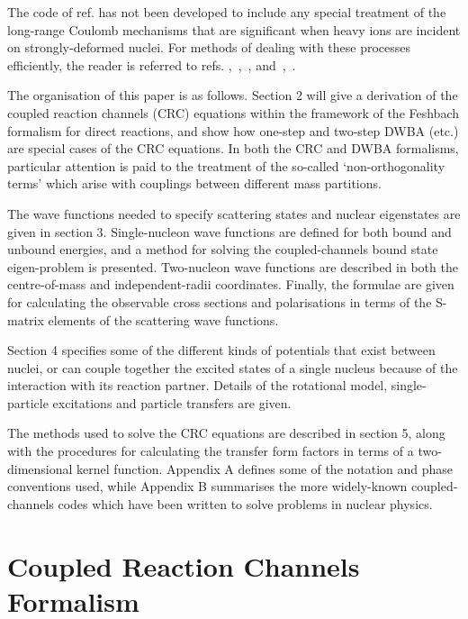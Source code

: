 \documentclass[11pt,a4paper]{article}
\begin{document}
The code of ref.\cite{FRESCO} has not been developed to include any
special treatment of the long-range Coulomb mechanisms that are significant
when heavy ions are incident on strongly-deformed nuclei.
For methods of
dealing with these processes efficiently, the reader is referred
to refs. \cite{AROSA},~\cite{AROSA2},~\cite{rbrown80}, and~\cite{PIECAN},~\cite{TOLSMA2}.

The organisation of this paper is as follows. Section 2 will give a
derivation of the coupled reaction channels (CRC) equations within the
framework of the Feshbach formalism for direct reactions, and show how
one-step and two-step DWBA (etc.) are special cases of the CRC equations. In
both the CRC and DWBA formalisms, particular attention is paid to the
treatment of the so-called `non-orthogonality terms' which arise
with couplings between different mass partitions.

The wave functions needed to specify scattering states and nuclear
eigenstates are given in section 3. Single-nucleon wave functions are
defined for both bound and unbound energies, and a method for solving the
coupled-channels bound state eigen-problem is presented. Two-nucleon wave
functions are described in both the centre-of-mass and independent-radii
coordinates. Finally, the formulae are given for calculating the
observable cross sections and polarisations in terms of the S-matrix
elements of the scattering wave functions.

Section 4 specifies some of the different kinds of potentials that exist
between nuclei, or can couple together the excited states of a single
nucleus because of the interaction with its reaction partner. Details of
the rotational model, single-particle excitations and particle transfers
are given.

The methods used to solve the CRC equations are described in section 5,
along with the procedures for calculating the transfer form factors in
terms of a two-dimensional kernel function.
Appendix A defines some of the notation and phase conventions used, while
Appendix B summarises the more widely-known coupled-channels codes which
have been written to solve problems in nuclear physics.
\section{Coupled Reaction Channels Formalism}
\end{document}
